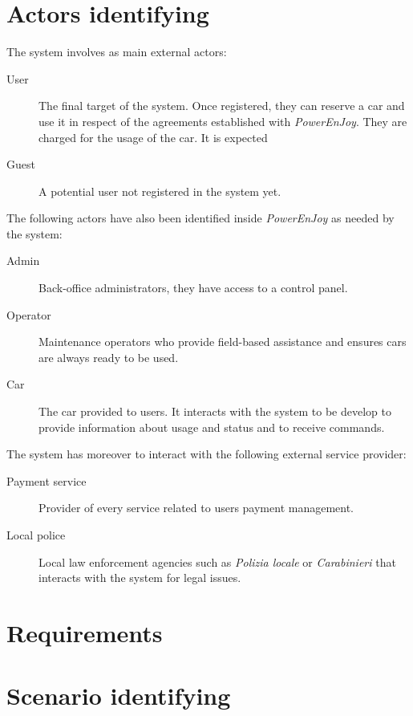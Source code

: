 \documentclass{article}
\begin{document}
	\section{Actors identifying}
		The system involves as main external actors:
		\begin{description}
			\item[User] The final target of the system. Once registered, they can reserve a car and use it in respect of the agreements established with \textit{PowerEnJoy}. They are charged for the usage of the car. It is expected

			\item[Guest] A potential user not registered in the system yet.
		\end{description}
		The following actors have also been identified inside \textit{PowerEnJoy} as needed by the system:
		\begin{description}
			\item[Admin] Back-office administrators, they have access to a control panel.

			\item[Operator] Maintenance operators who provide field-based assistance and ensures cars are always ready to be used.

			\item[Car] The car provided to users. It interacts with the system to be develop to provide information about usage and status and to receive commands.
		\end{description}
		The system has moreover to interact with the following external service provider:
		\begin{description}
			\item[Payment service] Provider of every service related to users payment management.
			\item[Local police] Local law enforcement agencies such as \textit{Polizia locale} or \textit{Carabinieri} that interacts with the system for legal issues.
		\end{description}

	\newpage
	\section{Requirements}
	

	\newpage
	\section{Scenario identifying}
	
		
\end{document}
